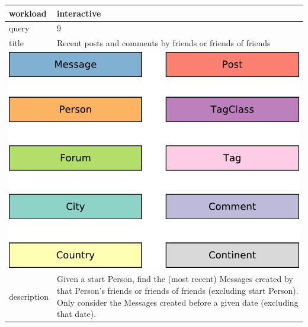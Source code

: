 \renewcommand*{\arraystretch}{1.1}

\noindent\begin{tabularx}{17cm}{|p{1.95cm}|X|}
	\hline
	workload    & interactive \\ \hline
%
	query       & 9 \\ \hline
%
	title       & Recent posts and comments by friends or friends of friends \\ \hline
	\multicolumn{2}{|c|}{ \includegraphics[scale=\patternscale,margin=0cm .2cm]{patterns/interactive09}} \\ \hline
	description & Given a start Person, find the (most recent) Messages created by that
Person's friends or friends of friends (excluding start Person). Only
consider the Messages created before a given date (excluding that date).
 \\ \hline
	

\end{tabularx}

